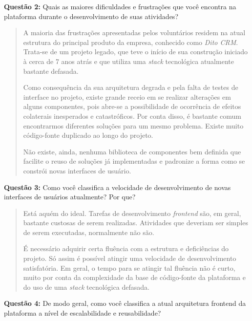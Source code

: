 \textbf{Questão 2:} Quais as maiores dificuldades e frustrações que você encontra na plataforma durante o desenvolvimento de suas atividades?

\begin{quote}
    A maioria das frustrações apresentadas pelos voluntários residem na atual estrutura do principal produto da empresa, conhecido como \textit{Dito CRM}. Trata-se de um projeto legado, que teve o início de sua construção iniciado à cerca de 7 anos atrás e que utiliza uma \textit{stack} tecnológica atualmente bastante defasada.
    
    Como consequência da sua arquitetura degrada e pela falta de testes de interface no projeto, existe grande receio em se realizar alterações em alguns componentes, pois abre-se a possibilidade de ocorrência de efeitos colaterais inesperados e catastróficos. Por conta disso, é bastante comum encontrarmos diferentes soluções para um mesmo problema. Existe muito código-fonte duplicado ao longo do projeto.
    
    Não existe, ainda, nenhuma biblioteca de componentes bem definida que facilite o reuso de soluções já implementadas e padronize a forma como se constrói novas interfaces de usuário.
\end{quote}

\textbf{Questão 3:} Como você classifica a velocidade de desenvolvimento de novas interfaces de usuários atualmente? Por que?

\begin{quote}
    Está aquém do ideal. Tarefas de desenvolvimento \textit{frontend} são, em geral, bastante custosas de serem realizadas. Atividades que deveriam ser simples de serem executadas, normalmente não são.
    
    É necessário adquirir certa fluência com a estrutura e deficiências do projeto. Só assim é possível atingir uma velocidade de desenvolvimento satisfatória. Em geral, o tempo para se atingir tal fluência não é curto, muito por conta da complexidade da base de código-fonte da plataforma e do uso de uma \textit{stack} tecnológica defasada.
\end{quote}

\textbf{Questão 4:} De modo geral, como você classifica a atual arquitetura frontend da plataforma a nível de escalabilidade e reusabilidade?

